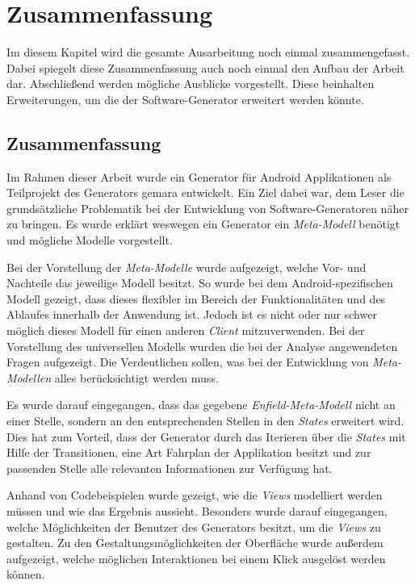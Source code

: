 \chapter{Zusammenfassung}
Im diesem Kapitel wird die gesamte Ausarbeitung noch einmal zusammengefasst. Dabei spiegelt diese Zusammenfassung auch noch einmal den Aufbau der Arbeit dar. Abschließend werden mögliche Ausblicke vorgestellt. Diese beinhalten Erweiterungen, um die der Software-Generator erweitert werden könnte.

\section{Zusammenfassung}
Im Rahmen dieser Arbeit wurde ein Generator für Android Applikationen als Teilprojekt des Generators \acf{gemara} entwickelt.
Ein Ziel dabei war, dem Leser die grundsätzliche Problematik bei der Entwicklung von Software-Generatoren näher zu bringen.
Es wurde erklärt weswegen ein Generator ein \textit{Meta-Modell} benötigt und mögliche Modelle vorgestellt. 

Bei der Vorstellung der \textit{Meta-Modelle} wurde aufgezeigt, welche Vor- und Nachteile das jeweilige Modell besitzt. So wurde bei dem Android-spezifischen Modell gezeigt, dass dieses flexibler im Bereich der Funktionalitäten und des Ablaufes innerhalb der Anwendung ist. Jedoch ist es nicht oder nur schwer möglich dieses Modell für einen anderen \textit{Client} mitzuverwenden. Bei der Vorstellung des universellen Modells wurden die bei der Analyse angewendeten Fragen aufgezeigt. Die Verdeutlichen sollen, was bei der Entwicklung von \textit{Meta-Modellen} alles berücksichtigt werden muss.

Es wurde darauf eingegangen, dass das gegebene \textit{Enfield-Meta-Modell} nicht an einer Stelle, sondern an den entsprechenden Stellen in den \textit{States} erweitert wird. Dies hat zum Vorteil, dass der Generator durch das Iterieren über die \textit{States} mit Hilfe der Transitionen, eine Art Fahrplan der Applikation besitzt und zur passenden Stelle alle relevanten Informationen zur Verfügung hat.

\newpage

Anhand von Codebeispielen wurde gezeigt, wie die \textit{Views} modelliert werden müssen und wie das Ergebnis aussieht. Besonders wurde darauf eingegangen, welche Möglichkeiten der Benutzer des Generators besitzt, um die \textit{Views} zu gestalten. Zu den Gestaltungsmöglichkeiten der Oberfläche wurde außerdem aufgezeigt, welche möglichen Interaktionen bei einem Klick ausgelöst werden können.

